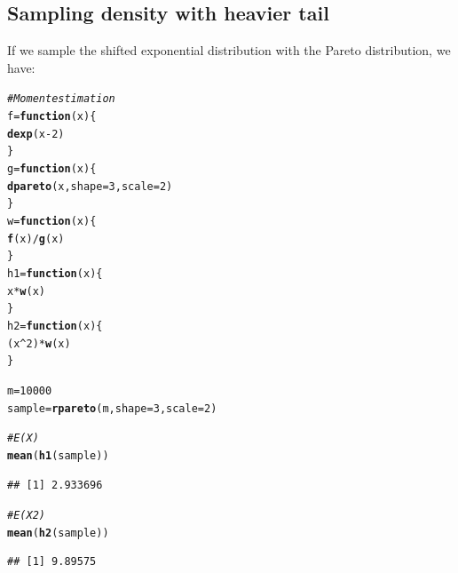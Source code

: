 \documentclass[11pt]{article}\usepackage[]{graphicx}\usepackage[]{color}
\makeatletter
\newcommand{\hlnum}[1]{\textcolor[rgb]{0.686,0.059,0.569}{#1}}%
\newcommand{\hlcom}[1]{\textcolor[rgb]{0.678,0.584,0.686}{\textit{#1}}}%
\newcommand{\hlopt}[1]{\textcolor[rgb]{0,0,0}{#1}}%
\newcommand{\hlstd}[1]{\textcolor[rgb]{0.345,0.345,0.345}{#1}}%
\newcommand{\hlkwa}[1]{\textcolor[rgb]{0.161,0.373,0.58}{\textbf{#1}}}%
\newcommand{\hlkwb}[1]{\textcolor[rgb]{0.69,0.353,0.396}{#1}}%
\newcommand{\hlkwc}[1]{\textcolor[rgb]{0.333,0.667,0.333}{#1}}%
\newcommand{\hlkwd}[1]{\textcolor[rgb]{0.737,0.353,0.396}{\textbf{#1}}}%
\newenvironment{kframe}{%
 \def\at@end@of@kframe{}%
 \ifinner\ifhmode%
  \def\at@end@of@kframe{\end{minipage}}%
  \begin{minipage}{\columnwidth}%
 \fi\fi%
 \def\FrameCommand##1{\hskip\@totalleftmargin \hskip-\fboxsep
 \colorbox{shadecolor}{##1}\hskip-\fboxsep
     \hskip-\linewidth \hskip-\@totalleftmargin \hskip\columnwidth}%
 \MakeFramed {\advance\hsize-\width
   \@totalleftmargin\z@ \linewidth\hsize
   \@setminipage}}%
 {\par\unskip\endMakeFramed%
 \at@end@of@kframe}
\newenvironment{knitrout}{}{} %
\makeatother
\begin{document}
\subsection{Sampling density with heavier tail}
If we sample the shifted exponential distribution with the Pareto distribution, we have:
\begin{knitrout}
\color{fgcolor}\begin{kframe}
\begin{alltt}
\hlcom{# Moment estimation}
\hlstd{f} \hlkwb{=} \hlkwa{function}\hlstd{(}\hlkwc{x}\hlstd{)\{}
  \hlkwd{dexp}\hlstd{(x}\hlopt{-}\hlnum{2}\hlstd{)}
\hlstd{\}}
\hlstd{g} \hlkwb{=} \hlkwa{function}\hlstd{(}\hlkwc{x}\hlstd{)\{}
  \hlkwd{dpareto}\hlstd{(x,}\hlkwc{shape}\hlstd{=}\hlnum{3}\hlstd{,}\hlkwc{scale}\hlstd{=}\hlnum{2}\hlstd{)}
\hlstd{\}}
\hlstd{w}\hlkwb{=}\hlkwa{function}\hlstd{(}\hlkwc{x}\hlstd{)\{}
  \hlkwd{f}\hlstd{(x)}\hlopt{/}\hlkwd{g}\hlstd{(x)}
\hlstd{\}}
\hlstd{h1}\hlkwb{=}\hlkwa{function}\hlstd{(}\hlkwc{x}\hlstd{)\{}
  \hlstd{x}\hlopt{*}\hlkwd{w}\hlstd{(x)}
\hlstd{\}}
\hlstd{h2}\hlkwb{=}\hlkwa{function}\hlstd{(}\hlkwc{x}\hlstd{)\{}
  \hlstd{(x}\hlopt{^}\hlnum{2}\hlstd{)}\hlopt{*}\hlkwd{w}\hlstd{(x)}
\hlstd{\}}

\hlstd{m}\hlkwb{=}\hlnum{10000}
\hlstd{sample}\hlkwb{=}\hlkwd{rpareto}\hlstd{(m,}\hlkwc{shape}\hlstd{=}\hlnum{3}\hlstd{,}\hlkwc{scale}\hlstd{=}\hlnum{2}\hlstd{)}

\hlcom{#E(X)}
\hlkwd{mean}\hlstd{(}\hlkwd{h1}\hlstd{(sample))}
\end{alltt}
\begin{verbatim}
## [1] 2.933696
\end{verbatim}
\begin{alltt}
\hlcom{#E(X2)}
\hlkwd{mean}\hlstd{(}\hlkwd{h2}\hlstd{(sample))}
\end{alltt}
\begin{verbatim}
## [1] 9.89575
\end{verbatim}
\end{kframe}
\end{knitrout}
\end{document}
